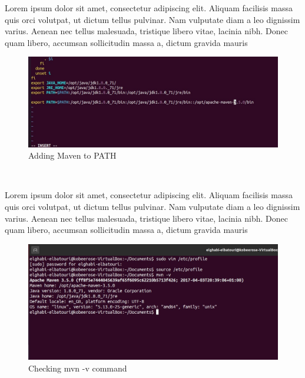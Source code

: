 \begin{spacing}{1.2}
\par Lorem ipsum dolor sit amet, consectetur adipiscing elit. Aliquam facilisis massa quis orci volutpat, ut dictum tellus pulvinar. Nam vulputate diam a leo dignissim varius. Aenean nec tellus malesuada, tristique libero vitae, lacinia nibh. Donec quam libero, accumsan sollicitudin massa a, dictum gravida mauris
\\
\begin{figure}[!htb] 
\begin{center} 
\includegraphics[width=1\linewidth]{Pictures/HBase/Data processing with Spark/Preparation of the environment/Adding Maven to PATH} 
\end{center} 
\caption{Adding Maven to PATH} 
\end{figure}  \FloatBarrier
\\

\par Lorem ipsum dolor sit amet, consectetur adipiscing elit. Aliquam facilisis massa quis orci volutpat, ut dictum tellus pulvinar. Nam vulputate diam a leo dignissim varius. Aenean nec tellus malesuada, tristique libero vitae, lacinia nibh. Donec quam libero, accumsan sollicitudin massa a, dictum gravida mauris
\\
\begin{figure}[!htb] 
\begin{center} 
\includegraphics[width=1\linewidth]{Pictures/HBase/Data processing with Spark/Preparation of the environment/Checking mvn -v command} 
\end{center} 
\caption{Checking mvn -v command} 
\end{figure}  \FloatBarrier
\\


\end{spacing}
